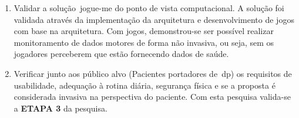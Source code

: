\begin{enumerate}
\item{Validar a solução~\ac{jogue-me} do ponto de vista computacional. A solução foi validada através da implementação da arquitetura e desenvolvimento de jogos com base na arquitetura. Com jogos, demonstrou-se ser possível realizar monitoramento de dados motores de forma não invasiva, ou seja, sem os jogadores perceberem que estão fornecendo dados de saúde.}

\item{Verificar junto aos público alvo (Pacientes portadores de~\ac{dp}) os requisitos de usabilidade, adequação à rotina diária, segurança física e se a proposta é considerada invasiva na perspectiva do paciente. Com esta pesquisa valida-se a \textbf{ETAPA 3} da pesquisa.}

    

\end{enumerate}

%
%

